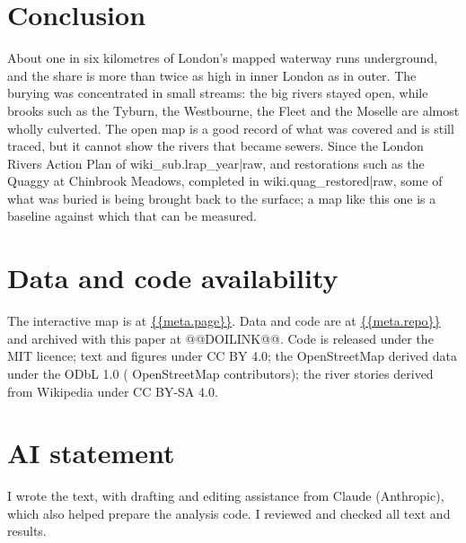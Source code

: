 \documentclass[11pt,a4paper]{article}
\begin{document}
\section{Conclusion}
About one in six kilometres of London's mapped waterway runs underground, and the share is more than twice as high in inner London as in outer. The burying was concentrated in small streams: the big rivers stayed open, while brooks such as the Tyburn, the Westbourne, the Fleet and the Moselle are almost wholly culverted. The open map is a good record of what was covered and is still traced, but it cannot show the rivers that became sewers. Since the London Rivers Action Plan of {{wiki_sub.lrap_year|raw}}, and restorations such as the Quaggy at Chinbrook Meadows, completed in {{wiki.quag_restored|raw}}, some of what was buried is being brought back to the surface; a map like this one is a baseline against which that can be measured.

\section*{Data and code availability}
The interactive map is at \url{{{meta.page}}}. Data and code are at \url{{{meta.repo}}} and archived with this paper at @@DOILINK@@. Code is released under the MIT licence; text and figures under CC BY 4.0; the OpenStreetMap derived data under the ODbL 1.0 (\textcopyright{} OpenStreetMap contributors); the river stories derived from Wikipedia under CC BY-SA 4.0.

\section*{AI statement}
I wrote the text, with drafting and editing assistance from Claude (Anthropic), which also helped prepare the analysis code. I reviewed and checked all text and results.
\end{document}
